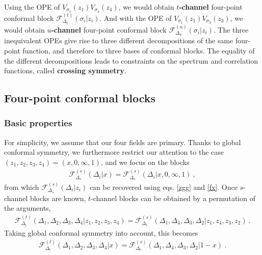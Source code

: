 \documentclass[12pt, a4paper, notitlepage, twoside]{report}
\numberwithin{equation}{section}
\theoremstyle{break}
\begin{document}
Using the OPE of $V_{\sigma_1}(z_1)V_{\sigma_4}(z_4)$, we would obtain \textbf{\boldmath $t$-channel} four-point conformal block $\mathcal{F}^{(t)}_{\Delta_t}(\sigma_i|z_i)$. And with the OPE of $V_{\sigma_1}(z_1)V_{\sigma_3}(z_3)$, we would obtain \textbf{\boldmath $u$-channel} four-point conformal block $\mathcal{F}^{(u)}_{\Delta_u}(\sigma_i|z_i)$. The three inequivalent OPEs give rise to three different decompositions of the same four-point function, and therefore to three bases of conformal blocks. The equality of the different decompositions leads to constraints on the spectrum and correlation functions, called \textbf{\boldmath crossing symmetry}.

\subsection{Four-point conformal blocks}

\subsubsection{Basic properties}

For simplicity, we assume that our four fields are primary.
Thanks to global conformal symmetry, we furthermore restrict our attention to the case $(z_1,z_2,z_3,z_4)=(x,0,\infty, 1)$, and we focus on the blocks
\begin{align}
 \mathcal{F}^{(s)}_{\Delta_s}(\Delta_i|x)=\mathcal{F}^{(s)}_{\Delta_s}(\Delta_i|x,0,\infty,1)\ ,
\end{align}
from which $\mathcal{F}^{(s)}_{\Delta_s}(\Delta_i|z_i)$ can be recovered  using eqs. \eqref{zgg} and \eqref{fx}.
Once $s$-channel blocks are known, $t$-channel blocks can be obtained by a permutation of the arguments, 
\begin{align}
 \mathcal{F}^{(t)}_{\Delta_t}(\Delta_1,\Delta_2,\Delta_3,\Delta_4|z_1,z_2,z_3,z_4) = \mathcal{F}^{(s)}_{\Delta_t}(\Delta_1,\Delta_4,\Delta_3,\Delta_2|z_1,z_4,z_3,z_2)\ . 
\label{gtgs}
\end{align}
Taking global conformal symmetry into account, this becomes
\begin{align}
 \mathcal{F}^{(t)}_{\Delta_t}(\Delta_1,\Delta_2,\Delta_3,\Delta_4|x) = \mathcal{F}^{(s)}_{\Delta_t}(\Delta_1,\Delta_4,\Delta_3,\Delta_2|1-x)\ .
\end{align}
\end{document}
